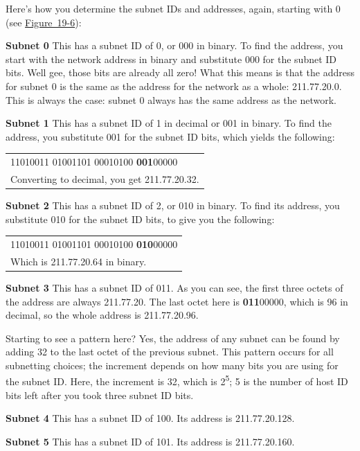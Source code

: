 \documentclass[b5paper,11pt]{memoir}
\begin{document}
Here's how you determine the subnet IDs and addresses, again, starting
with 0 (see
\protect\hyperlink{ch19s04.htmlux5cux23determining_subnet_addresses_for_a_class}{Figure~19-6}):

{\textbf{Subnet 0}} This has a subnet ID of 0, or 000 in binary. To find
the address, you start with the network address in binary and substitute
000 for the subnet ID bits. Well gee, those bits are already all zero!
What this means is that the address for subnet 0 is the same as the
address for the network as a whole: 211.77.20.0. This is always the
case: subnet 0 always has the same address as the network.

{\textbf{Subnet 1}} This has a subnet ID of 1 in decimal or 001 in
binary. To find the address, you substitute 001 for the subnet ID bits,
which yields the following:

\begin{longtable}[]{@{}l@{}}
\toprule
\endhead
11010011 01001101 00010100 {\textbf{001}}00000\tabularnewline
Converting to decimal, you get 211.77.20.32.\tabularnewline
\bottomrule
\end{longtable}

{\textbf{Subnet 2}} This has a subnet ID of 2, or 010 in binary. To find
its address, you substitute 010 for the subnet ID bits, to give you the
following:

\begin{longtable}[]{@{}l@{}}
\toprule
\endhead
11010011 01001101 00010100 {\textbf{010}}00000\tabularnewline
Which is 211.77.20.64 in binary.\tabularnewline
\bottomrule
\end{longtable}

{\textbf{Subnet 3}} This has a subnet ID of 011. As you can see, the
first three octets of the address are always 211.77.20. The last octet
here is {\textbf{011}}00000, which is 96 in decimal, so the whole
address is 211.77.20.96.

Starting to see a pattern here? Yes, the address of any subnet can be
found by adding 32 to the last octet of the previous subnet. This
pattern occurs for all subnetting choices; the increment depends on how
many bits you are using for the subnet ID. Here, the increment is 32,
which is 2\textsuperscript{5}; 5 is the number of host ID bits left
after you took three subnet ID bits.

{\textbf{Subnet 4}} This has a subnet ID of 100. Its address is
211.77.20.128.

{\textbf{Subnet 5}} This has a subnet ID of 101. Its address is
211.77.20.160.
\end{document}
